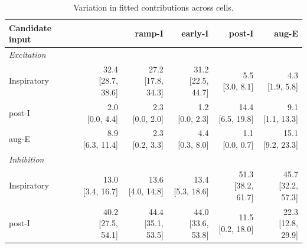\begin{table}[htbp]
\centering\small
\caption{Variation in fitted contributions across cells.}
\label{tab:contribution_variation}
\begin{tabular}{@{}lrrrrr@{}}
\toprule
Candidate input & \preII{} & ramp-I & early-I & post-I & aug-E \\
\midrule
\multicolumn{6}{l}{\textit{Excitation}} \\
Inspiratory & \shortstack{32.4\\{}[28.7, 38.6]} & \shortstack{27.2\\{}[17.8, 34.3]} & \shortstack{31.2\\{}[22.5, 44.7]} & \shortstack{5.5\\{}[3.0, 8.1]} & \shortstack{4.3\\{}[1.9, 5.8]} \\[6pt]
post-I & \shortstack{2.0\\{}[0.0, 4.4]} & \shortstack{2.3\\{}[0.0, 2.0]} & \shortstack{1.2\\{}[0.0, 2.3]} & \shortstack{14.4\\{}[6.5, 19.8]} & \shortstack{9.1\\{}[1.1, 13.3]} \\[6pt]
aug-E & \shortstack{8.9\\{}[6.3, 11.4]} & \shortstack{2.3\\{}[0.2, 3.3]} & \shortstack{4.4\\{}[0.3, 8.0]} & \shortstack{1.1\\{}[0.0, 0.7]} & \shortstack{15.1\\{}[9.2, 23.3]} \\[6pt]
\multicolumn{6}{l}{\textit{Inhibition}} \\
Inspiratory & \shortstack{13.0\\{}[3.4, 16.7]} & \shortstack{13.6\\{}[4.0, 14.8]} & \shortstack{13.4\\{}[5.3, 18.6]} & \shortstack{51.3\\{}[38.2, 61.7]} & \shortstack{45.7\\{}[32.2, 57.3]} \\[6pt]
post-I & \shortstack{40.2\\{}[27.5, 54.1]} & \shortstack{44.4\\{}[35.1, 53.5]} & \shortstack{44.0\\{}[33.6, 53.8]} & \shortstack{11.5\\{}[0.2, 18.0]} & \shortstack{22.3\\{}[12.8, 29.9]} \\[6pt]

\end{tabular}
\end{table}
